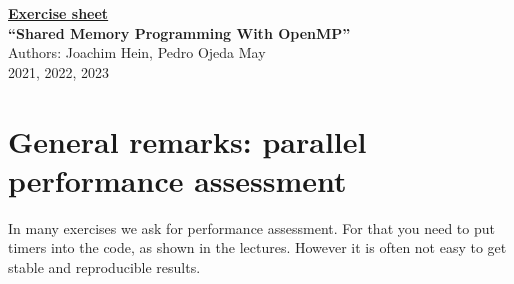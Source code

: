 \documentclass[a4paper,oneside,12pt]{article}
\begin{document}
\thispagestyle{empty}

\begin{center}
  \underline{\large \bf Exercise sheet}\\\vspace{0.7cm}
  {\Large \bf ``Shared Memory Programming With OpenMP''}\\[2ex]
  {\Large Authors: Joachim Hein, Pedro Ojeda May\\[2ex]  2021, 2022, 2023}
  \vspace{0.5cm}
\end{center}

\section*{General remarks: parallel performance assessment}

In many exercises we ask for performance assessment.  For that you need to put timers into the code, as shown in the lectures.  However it is often not easy to get stable and reproducible results.
\end{document}
